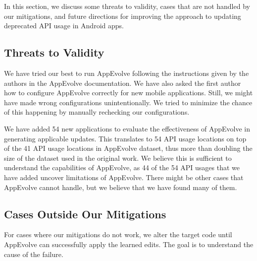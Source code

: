 In this section, we discuss some threats to validity, cases that are not
handled by our mitigations, and future directions for improving the
approach to updating deprecated API usage in Android apps.

\subsection{Threats to Validity}

We have tried our best to run AppEvolve following the instructions given by
the authors in the AppEvolve documentation. We have also asked the first
author how to configure AppEvolve correctly for new mobile
applications. Still, we might have made wrong configurations
unintentionally. We tried to minimize the chance of this happening by
manually rechecking our configurations.

We have added 54 new applications to evaluate the effectiveness of
AppEvolve in generating applicable updates. This translates to 54 API usage
locations on top of the 41 API usage locations in AppEvolve dataset, thus
more than doubling the size of the dataset used in the original work. We
believe this is sufficient to understand the capabilities of AppEvolve, as
44 of the 54 API usages that we have added uncover limitations of
AppEvolve. There might be other cases that AppEvolve cannot handle, but we
believe that we have found many of them.


\subsection{Cases Outside Our Mitigations}
For cases where our mitigations do not work, we alter the target code until
AppEvolve can successfully apply the learned edits. The goal is to
understand the cause of the failure.

